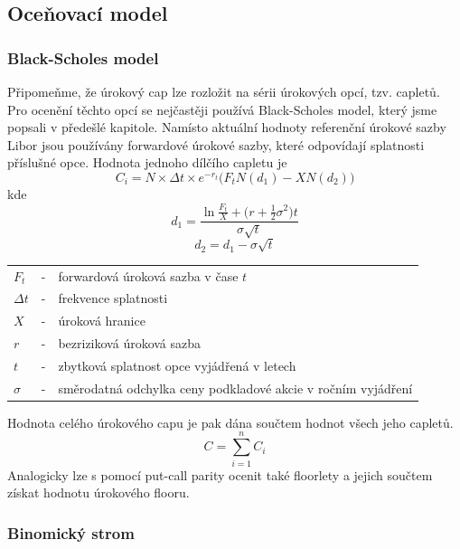 \documentclass[a4paper]{book}
\begin{document}
\subsection{Oceňovací model}

\subsubsection{Black-Scholes model}

Připomeňme, že úrokový cap lze rozložit na sérii úrokových opcí, tzv. capletů. Pro ocenění těchto opcí se nejčastěji používá Black-Scholes model, který jsme popsali v předešlé kapitole. Namísto aktuální hodnoty referenční úrokové sazby Libor jsou používány forwardové úrokové sazby, které odpovídají splatnosti příslušné opce. Hodnota jednoho dílčího capletu je
\begin{equation*}
C_i = N \times \Delta t \times e^{-r_t} \big( F_t N(d_1) - X  N(d_2) \Big)
\end{equation*}
kde
\begin{equation*}
d_1 = \frac{\ln \frac{F_t}{X} + \big(r + \frac{1}{2}\sigma^2 \big)t}{\sigma \sqrt{t}}
\end{equation*}
\begin{equation*}
d_2 = d_1 - \sigma \sqrt{t}
\end{equation*}
\begin{center}
\begin{tabular}{ l c l}
$F_t$ & - & forwardová úroková sazba v čase $t$\\
$\Delta t$ & - & frekvence splatnosti\\
$X$ & - & úroková hranice\\
$r$ & - & bezriziková úroková sazba\\
$t$ & - & zbytková splatnost opce vyjádřená v letech\\
$\sigma$ & - & směrodatná odchylka ceny podkladové akcie v ročním vyjádření
\end{tabular}
\end{center}
Hodnota celého úrokového capu je pak dána součtem hodnot všech jeho capletů.
\begin{equation*}
C = \sum_{i = 1}^n C_i
\end{equation*}
Analogicky lze s pomocí put-call parity ocenit také floorlety a jejich součtem získat hodnotu úrokového flooru. 

\subsubsection{Binomický strom}
\end{document}
